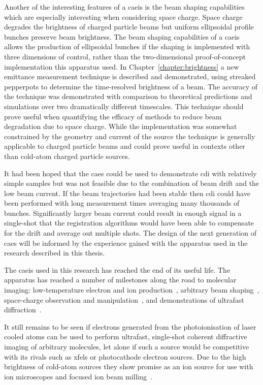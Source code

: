 Another of the interesting features of a \gls{caeis} is the beam shaping capabilities which are especially interesting when considering space charge.
Space charge degrades the brightness of charged particle beams but uniform ellipsoidal profile bunches preserve beam brightness.
The beam shaping capabilities of a \gls{caeis} allows the production of ellipsoidal bunches if the shaping is implemented with three dimensions of control, rather than the two-dimensional proof-of-concept implementation this apparatus used.
In Chapter~\ref{chapter:brightness} a new emittance measurement technique is described and demonstrated, using streaked pepperpots to determine the time-resolved brightness of a beam.
The accuracy of the technique was demonstrated with comparison to theoretical predictions and simulations over two dramatically different timescales.
This technique should prove useful when quantifying the efficacy of methods to reduce beam degradation due to space charge.
While the implementation was somewhat constrained by the geometry and current of the source the technique is generally applicable to charged particle beams and could prove useful in contexts other than cold-atom charged particle sources.

It had been hoped that the \gls{caes} could be used to demonstrate \gls{cdi} with relatively simple samples but was not feasible due to the combination of beam drift and the low beam current.
If the beam trajectories had been stable then \gls{cdi} could have been performed with long measurement times averaging many thousands of bunches.
Significantly larger beam current could result in enough signal in a single-shot that the registration algorithms would have been able to compensate for the drift and average out multiple shots.
The design of the next generation of \gls{caes} will be informed by the experience gained with the apparatus used in the research described in this thesis.

The \gls{caeis} used in this research has reached the end of its useful life.
The apparatus has reached a number of milestones along the road to molecular imaging: low-temperature electron and ion production~\cite{saliba_spatial_2012,mcculloch_high-coherence_2013,mcculloch_field_2017,speirs_identification_2017}, arbitrary beam shaping~\cite{mcculloch_arbitrarily_2011}, space-charge observation and manipulation~\cite{murphy_detailed_2014,murphy_increasing_2015,thompson_suppression_2016}, and demonstrations of ultrafast diffraction~\cite{speirs_single-shot_2015}.

It still remains to be seen if electrons generated from the photoionisation of laser cooled atoms can be used to perform ultrafast, single-shot coherent diffractive imaging of arbitrary molecules, let alone if such a source would be competitive with its rivals such as \glspl{xfel} or photocathode electron sources.
Due to the high brightness of cold-atom sources they show promise as an ion source for use with ion microscopes and focused ion beam milling~\cite{steele_high-brightness_2017}.

